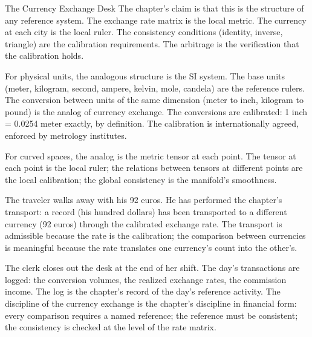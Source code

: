 \begin{coda}{The Currency Exchange Desk}
The chapter's claim is that this is the structure of any
reference system. The exchange rate matrix is the local metric.
The currency at each city is the local ruler. The consistency
conditions (identity, inverse, triangle) are the calibration
requirements. The arbitrage is the verification that the
calibration holds.

For physical units, the analogous structure is the SI system.
The base units (meter, kilogram, second, ampere, kelvin, mole,
candela) are the reference rulers. The conversion between units
of the same dimension (meter to inch, kilogram to pound) is the
analog of currency exchange. The conversions are calibrated:
1 inch = 0.0254 meter exactly, by definition. The calibration
is internationally agreed, enforced by metrology institutes.

For curved spaces, the analog is the metric tensor at each
point. The tensor at each point is the local ruler; the
relations between tensors at different points are the local
calibration; the global consistency is the manifold's
smoothness.

The traveler walks away with his 92 euros. He has performed the
chapter's transport: a record (his hundred dollars) has been
transported to a different currency (92 euros) through the
calibrated exchange rate. The transport is admissible because
the rate is the calibration; the comparison between currencies
is meaningful because the rate translates one currency's count
into the other's.

The clerk closes out the desk at the end of her shift. The
day's transactions are logged: the conversion volumes, the
realized exchange rates, the commission income. The log is
the chapter's record of the day's reference activity. The
discipline of the currency exchange is the chapter's
discipline in financial form: every comparison requires a
named reference; the reference must be consistent; the
consistency is checked at the level of the rate matrix.

\end{coda}

